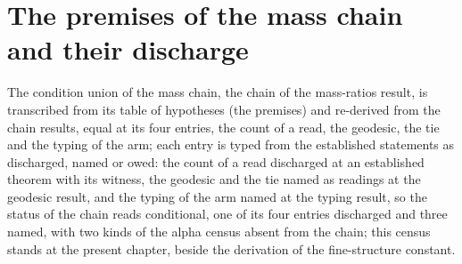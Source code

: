 \section{The premises of the mass chain and their discharge}\label{mod:V-1-D537668-the-mass-chain-premise-discharge-census}
\begin{chtable}\label{box:V-1-D537668-the-mass-chain-premise-discharge-census:1}
The condition union of the mass chain, the chain of the mass-ratios result, is transcribed from its table of hypotheses (the premises) and re-derived from the chain results, equal at its four entries, the count of a read, the geodesic, the tie and the typing of the arm; each entry is typed from the established statements as discharged, named or owed: the count of a read discharged at an established theorem with its witness, the geodesic and the tie named as readings at the geodesic result, and the typing of the arm named at the typing result, so the status of the chain reads conditional, one of its four entries discharged and three named, with two kinds of the alpha census absent from the chain; this census stands at the present chapter, beside the derivation of the fine-structure constant.
\end{chtable}
